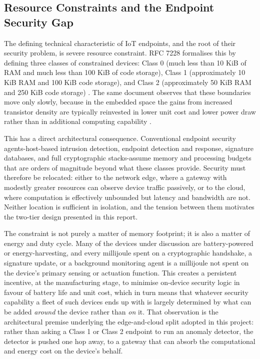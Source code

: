 \subsection{Resource Constraints and the Endpoint Security Gap}

The defining technical characteristic of IoT endpoints, and the root of their security problem, is severe resource constraint. RFC 7228 formalises this by defining three classes of constrained devices: Class 0 (much less than 10 KiB of RAM and much less than 100 KiB of code storage), Class 1 (approximately 10 KiB RAM and 100 KiB code storage), and Class 2 (approximately 50 KiB RAM and 250 KiB code storage) \cite{Bormann2014}. The same document observes that these boundaries move only slowly, because in the embedded space the gains from increased transistor density are typically reinvested in lower unit cost and lower power draw rather than in additional computing capability \cite{Bormann2014}.

This has a direct architectural consequence. Conventional endpoint security agents-host-based intrusion detection, endpoint detection and response, signature databases, and full cryptographic stacks-assume memory and processing budgets that are orders of magnitude beyond what these classes provide. Security must therefore be relocated: either to the network edge, where a gateway with modestly greater resources can observe device traffic passively, or to the cloud, where computation is effectively unbounded but latency and bandwidth are not. Neither location is sufficient in isolation, and the tension between them motivates the two-tier design presented in this report.

The constraint is not purely a matter of memory footprint; it is also a matter of energy and duty cycle. Many of the devices under discussion are battery-powered or energy-harvesting, and every millijoule spent on a cryptographic handshake, a signature update, or a background monitoring agent is a millijoule not spent on the device's primary sensing or actuation function. This creates a persistent incentive, at the manufacturing stage, to minimise on-device security logic in favour of battery life and unit cost, which in turn means that whatever security capability a fleet of such devices ends up with is largely determined by what can be added \emph{around} the device rather than \emph{on} it. That observation is the architectural premise underlying the edge-and-cloud split adopted in this project: rather than asking a Class 1 or Class 2 endpoint to run an anomaly detector, the detector is pushed one hop away, to a gateway that can absorb the computational and energy cost on the device's behalf.

